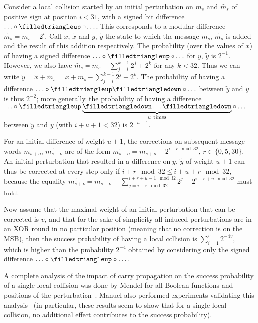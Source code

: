 Consider a local collision started by an initial perturbation on $m_s$ and $\widetilde{m_s}$ of positive sign at position $i < 31$, \ie with a signed bit difference $\ldots\mnodiff\monediffu\mnodiff\ldots$.
This corresponds to a modular difference $\widetilde{m_s} = m_s + 2^i$. Call $x$, $\widetilde{x}$ and $y$, $\widetilde{y}$ the state to which the message $m_s$, $\widetilde{m_s}$ is added and the result of this addition
respectively. The probability (over the values of $x$) of having a signed difference $\ldots\mnodiff\monediffu\mnodiff\ldots$ for $y$, $\widetilde{y}$ is $2^{-1}$.
However, we also have $\widetilde{m_s} = m_s - \sum_{j = i}^{k - 1}2^j + 2^k$ for any $k < 32$. Thus we can write $\widetilde{y} = \widetilde{x} + \widetilde{m_s} = x + m_s - \sum_{j = i}^{k - 1}2^j + 2^k$. The
probability of having a difference $\ldots\mnodiff\monediffu\monediffd\mnodiff\ldots$ between $\widetilde{y}$ and $y$ is thus $2^{-2}$; more generally, the probability of
having a difference $\ldots\mnodiff\monediffu\underbrace{\monediffd\ldots\monediffd}_{u~\text{times}}\mnodiff\ldots$ between $\widetilde{y}$ and $y$ (with $i+u+1 < 32$) is $2^{-u-1}$.

For an initial difference of weight $u+1$, the corrections on subsequent message words $m_{s+o}$, $\widetilde{m_{s+o}}$ are of the form $\widetilde{m_{s+o}} = m_{s+o} - 2^{i+r\mod 32}$, $r \in \{0,5,30\}$.
An initial perturbation that resulted in a difference on $y$, $\widetilde{y}$ of weight $u+1$ can thus be corrected at every step only if $i+r\mod 32 \leq i+u+r\mod 32$, because the equality
$\widetilde{m_{s+o}} = m_{s+o} + \sum_{j = i+r \mod 32}^{i+r+u-1 \mod 32}2^j - 2^{i+r+u \mod 32}$ must hold.

Now assume that the maximal weight of an initial perturbation that can be corrected is $v$, and that for the sake of simplicity all induced perturbations are in an XOR round in no particular position
(meaning that no correction is on the MSB), then the success probability of having a local collision is $\sum_{i=1}^{v}2^{-4v}$, which is higher than the probability $2^{-4}$ obtained by considering
only the signed difference $\ldots\mnodiff\monediffu\mnodiff\ldots$.

A complete analysis of the impact of carry propagation on the success probability of a single local collision was done
by Mendel \etal for all Boolean functions and positions of the perturbation~\cite{DBLP:conf/fse/MendelPRR06a}. Manuel also performed experiments validating this analysis~\cite{DBLP:journals/dcc/Manuel11}
(in particular, these results seem to show that for a single local collision, no additional effect contributes to the success probability).


